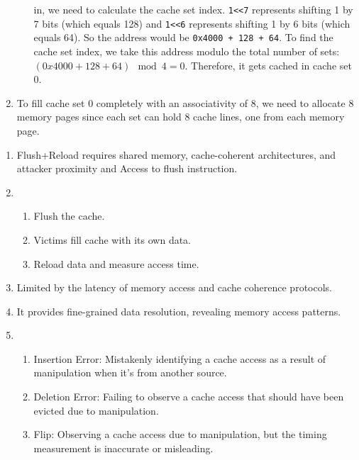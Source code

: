 \documentclass[sheet=2, prefix, english]{dexercise}
\begin{document}
\begin{enumerate}
\begin{enumerate}
        in, we need to calculate the cache set index.
        \texttt{1<<7} represents shifting 1 by 7 bits (which equals 128) and
        \texttt{1<<6} represents shifting 1 by 6 bits (which equals 64).
        So the address would be \texttt{0x4000 + 128 + 64}.
        To find the cache set index, we take this address modulo the total
        number of sets: $ (0x4000 + 128 + 64) \mod 4 = 0$.
        Therefore, it gets cached in cache set 0.
    \end{enumerate}
  \item
    To fill cache set 0 completely with an associativity of 8, we need to
    allocate 8 memory pages since each set can hold 8 cache lines, one from
    each memory page.
\end{enumerate}


\begin{enumerate}
  \item
  Flush+Reload requires shared memory, cache-coherent architectures, and
    attacker proximity and Access to flush instruction.
  \item
    \begin{enumerate}
      \item Flush the cache.
      \item Victims fill cache with its own data.
      \item Reload data and measure access time.
    \end{enumerate}
  \item Limited by the latency of memory access and cache coherence protocols.
  \item It provides fine-grained data resolution, revealing memory access patterns.
  \item
    \begin{enumerate}
      \item Insertion Error: Mistakenly identifying a cache access as a result
        of manipulation when it's from another source.
      \item Deletion Error: Failing to observe a cache access that should have
        been evicted due to manipulation.
      \item Flip: Observing a cache access due to manipulation, but the timing
        measurement is inaccurate or misleading.
    \end{enumerate}

\end{enumerate}

\end{document}
